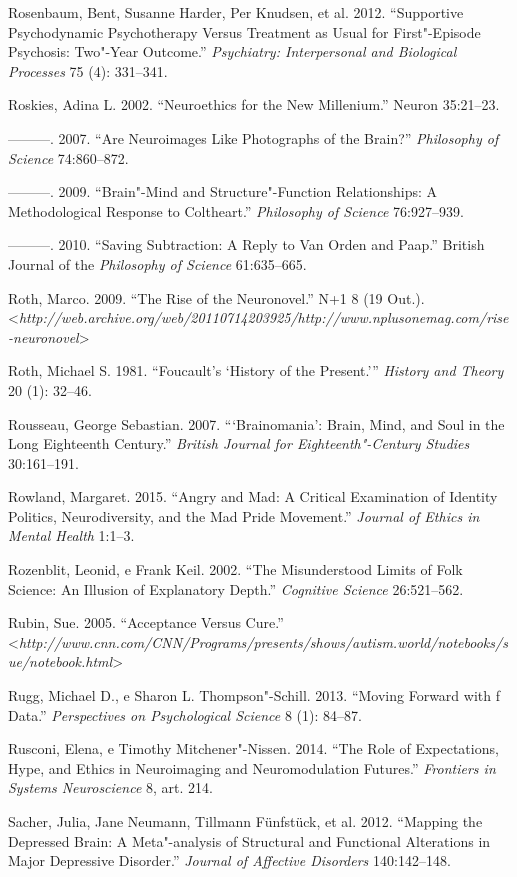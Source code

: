 Rosenbaum, Bent, Susanne Harder, Per Knudsen, et al. 2012. ``Supportive
Psychodynamic Psychotherapy Versus Treatment as Usual for First"-Episode
Psychosis: Two"-Year Outcome.'' \emph{Psychiatry: Interpersonal and
Biological Processes} 75 (4): 331--341.

Roskies, Adina L. 2002. ``Neuroethics for the New Millenium.'' Neuron
35:21--23.

---------. 2007. ``Are Neuroimages Like Photographs of the Brain?''
\emph{Philosophy of Science} 74:860--872.

---------. 2009. ``Brain"-Mind and Structure"-Function Relationships: A
Methodological Response to Coltheart.'' \emph{Philosophy of Science}
76:927--939.

---------. 2010. ``Saving Subtraction: A Reply to Van Orden and Paap.''
British Journal of the \emph{Philosophy of Science} 61:635--665.

Roth, Marco. 2009. ``The Rise of the Neuronovel.'' N+1 8 (19 Out.).
\textless{}\emph{http://web.archive.org/web/20110714203925/http://www.nplusonemag.com/rise-neuronovel}\textgreater{}

Roth, Michael S. 1981. ``Foucault's `History of the Present.'''
\emph{History and Theory} 20 (1): 32--46.

Rousseau, George Sebastian. 2007. ```Brainomania': Brain, Mind, and Soul
in the Long Eighteenth Century.'' \emph{British Journal for
Eighteenth"-Century Studies} 30:161--191.

Rowland, Margaret. 2015. ``Angry and Mad: A Critical Examination of
Identity Politics, Neurodiversity, and the Mad Pride Movement.''
\emph{Journal of Ethics in Mental Health} 1:1--3.

Rozenblit, Leonid, e Frank Keil. 2002. ``The Misunderstood Limits of
Folk Science: An Illusion of Explanatory Depth.'' \emph{Cognitive
Science} 26:521--562.

Rubin, Sue. 2005. ``Acceptance Versus Cure.''
\textless{}\emph{http://www.cnn.com/CNN/Programs/presents/shows/autism.world/notebooks/sue/notebook.html}\textgreater{}

Rugg, Michael D., e Sharon L. Thompson"-Schill. 2013. ``Moving Forward
with f Data.'' \emph{Perspectives on Psychological Science} 8 (1):
84--87.

Rusconi, Elena, e Timothy Mitchener"-Nissen. 2014. ``The Role of
Expectations, Hype, and Ethics in Neuroimaging and Neuromodulation
Futures.'' \emph{Frontiers in Systems Neuroscience} 8, art. 214.

Sacher, Julia, Jane Neumann, Tillmann Fünfstück, et al. 2012. ``Mapping
the Depressed Brain: A Meta"-analysis of Structural and Functional
Alterations in Major Depressive Disorder.'' \emph{Journal of Affective
Disorders} 140:142--148.

